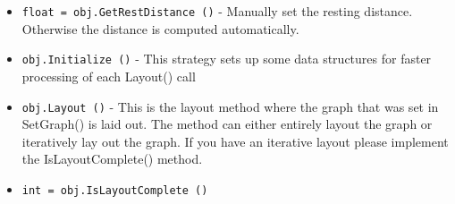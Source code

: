 \begin{itemize}
\item  \verb|float = obj.GetRestDistance ()| -  Manually set the resting distance. Otherwise the
 distance is computed automatically.

\item  \verb|obj.Initialize ()| -  This strategy sets up some data structures
 for faster processing of each Layout() call

\item  \verb|obj.Layout ()| -  This is the layout method where the graph that was
 set in SetGraph() is laid out. The method can either
 entirely layout the graph or iteratively lay out the
 graph. If you have an iterative layout please implement
 the IsLayoutComplete() method.

\item  \verb|int = obj.IsLayoutComplete ()|

\end{itemize}
